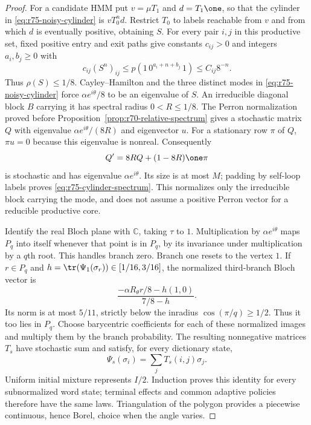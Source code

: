 \begin{proof}
For a candidate HMM put $v=\mu T_1$ and $d=T_1\one$, so that the cylinder
in \eqref{eq:r75-noisy-cylinder} is $vT_0^nd$.  Restrict $T_0$ to labels
reachable from $v$ and from which $d$ is eventually positive, obtaining
$S$.  For every pair $i,j$ in this productive set, fixed positive entry
and exit paths give constants $c_{ij}>0$ and integers $a_i,b_j\ge0$ with
\[
 c_{ij}(S^n)_{ij}\le p(1\,0^{a_i+n+b_j}\,1)\le C_{ij}8^{-n}.
\]
Thus $\rho(S)\le1/8$.  Cayley--Hamilton and the three distinct modes in
\eqref{eq:r75-noisy-cylinder} force
$\alpha e^{i\theta}/8$ to be an eigenvalue of $S$.
An irreducible diagonal block $B$ carrying it has spectral radius
$0<R\le1/8$.  The Perron normalization proved before
Proposition~\ref{prop:r70-relative-spectrum} gives a stochastic matrix
$Q$ with eigenvalue $\alpha e^{i\theta}/(8R)$ and eigenvector $u$.
For a stationary row $\pi$ of $Q$, $\pi u=0$ because this eigenvalue is
nonreal.  Consequently
\[
 Q'=8R Q+(1-8R)\one\pi
\]
is stochastic and has eigenvalue $\alpha e^{i\theta}$.  Its size is at
most $M$; padding by self-loop labels proves
\eqref{eq:r75-cylinder-spectrum}.  This normalizes only the irreducible
block carrying the mode, and does not assume a positive Perron vector for
a reducible productive core.

Identify the real Bloch plane with $\mathbb C$, taking $\tau$ to $1$.
Multiplication by $\alpha e^{i\theta}$ maps $P_q$ into itself whenever
that point is in $P_q$, by its invariance under multiplication by a
$q$th root.  This handles branch zero.  Branch one resets to the vertex
$1$.  If $r\in P_q$ and $h=\tr(\Psi_1(\sigma_r))\in[1/16,3/16]$, the
normalized third-branch Bloch vector is
\[
 \frac{-\alpha R_\theta r/8-h(1,0)}{7/8-h}.
\]
Its norm is at most $5/11$, strictly below the inradius
$\cos(\pi/q)\ge1/2$.  Thus it too lies in $P_q$.
Choose barycentric coefficients for each of these normalized images and
multiply them by the branch probability.  The resulting nonnegative
matrices $T_s$ have stochastic sum and satisfy, for every dictionary state,
\[
 \Psi_s(\sigma_i)=\sum_jT_s(i,j)\sigma_j.
\]
Uniform initial mixture represents $I/2$.  Induction proves this identity
for every subnormalized word state; terminal effects and common adaptive
policies therefore have the same laws.  Triangulation of the polygon
provides a piecewise continuous, hence Borel, choice when the angle varies.
\end{proof}

